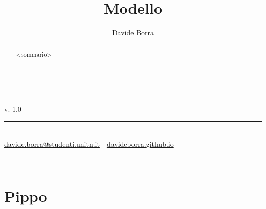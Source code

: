 \documentclass{article}
\title{Modello}
\author{Davide Borra}
\date{}
\makeatletter
\let\runauthor\@author
\let\runtitle\@title
\makeatother
\begin{document}
\lhead{}
\chead{}
\rfoot{\runauthor}

\begin{titlepage}
    \pagestyle{empty}
    \begin{center}
        \vspace*{\fill}
        \vspace{0.5cm}
        \textbf{\Huge \runtitle}\\\vspace{5mm}
        \textsc{\Large \runauthor}
        \vspace{5cm}
    \end{center}
    \vspace*{\fill}
    v. 1.0\\
    \rule{0.8\linewidth}{0.5mm}\\
    {\footnotesize\href{mailto:davide.borra@studenti.unitn.it}{davide.borra@studenti.unitn.it} - \href{http://davideborra.github.io}{davideborra.github.io}}
    \restoregeometry\newpage
    \thispagestyle{empty}
\end{titlepage}
    \begin{abstract}
        \centering <sommario>
    \end{abstract}
    \tableofcontents
    \creativecommons
    \newpage
    
    
    \lhead{\runtitle}\
    \chead{}
    \rhead{\rightmark}
    \rfoot{\runauthor}

    \section{Pippo}
\end{document}

